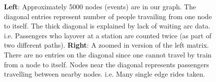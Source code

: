 \documentclass[11pt]{article}
\begin{document}
\begin{figure}[htp]
    \centering
    \hfill%
    \caption{\textbf{Left}: Approximately 5000 nodes (events) are in our graph. The diagonal entries represent number of people travailing from one node to itself. The thick diagonal is explained by lack of waiting arc data. i.e. Passengers who layover at a station are counted twice (as part of two different paths). \textbf{Right}: A zoomed in version of the left matrix. There are no entries on the diagonal since one cannot travel by train from a node to itself. Nodes near the diagonal represents passengers travelling between nearby nodes. i.e. Many single edge rides taken.}
\end{figure}
\end{document}
